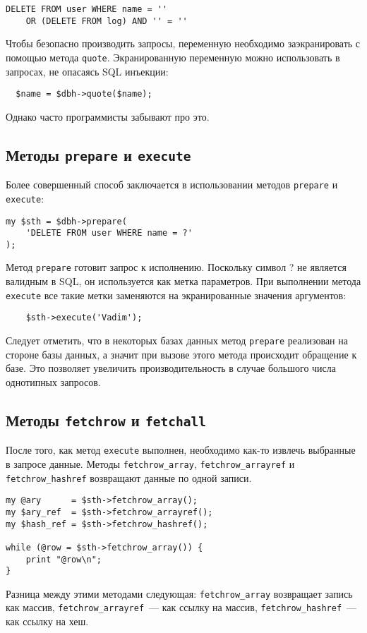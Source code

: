 \begin{verbatim}
DELETE FROM user WHERE name = ''
    OR (DELETE FROM log) AND '' = ''
\end{verbatim}

Чтобы безопасно производить запросы, переменную необходимо заэкранировать
с помощью метода \verb|quote|.
Экранированную переменную можно использовать в запросах, не опасаясь SQL инъекции:
\begin{verbatim}
  $name = $dbh->quote($name);
\end{verbatim}
Однако часто программисты забывают про это.

\subsection{Методы \texttt{prepare} и \texttt{execute}}
Более совершенный способ заключается в использовании методов \verb|prepare| и \verb|execute|:
\begin{verbatim}
my $sth = $dbh->prepare(
    'DELETE FROM user WHERE name = ?'
);
\end{verbatim}
Метод \verb|prepare| готовит запрос к исполнению. Поскольку символ ? не является валидным в SQL, он используется как метка параметров. При выполнении метода \verb|execute| все такие метки заменяются на экранированные значения аргументов:
\begin{verbatim}
    $sth->execute('Vadim');
\end{verbatim}
Следует отметить, что в некоторых базах данных метод \verb|prepare| реализован на стороне базы данных,
а значит при вызове этого метода происходит обращение к базе.
Это позволяет увеличить производительность в случае большого числа однотипных запросов.

\subsection{Методы \texttt{fetchrow} и \texttt{fetchall}}
После того, как метод \verb|execute| выполнен, необходимо как-то извлечь выбранные в запросе данные.
Методы \verb|fetchrow_array|, \verb|fetchrow_arrayref| и \verb|fetchrow_hashref| возвращают данные по одной записи.
\begin{verbatim}
my @ary      = $sth->fetchrow_array();
my $ary_ref  = $sth->fetchrow_arrayref();
my $hash_ref = $sth->fetchrow_hashref();

while (@row = $sth->fetchrow_array()) {
    print "@row\n";
}
\end{verbatim}
Разница между этими методами следующая: \verb|fetchrow_array| возвращает запись как массив,
\verb|fetchrow_arrayref|~--- как ссылку на массив, \verb|fetchrow_hashref|~--- как ссылку на хеш.

